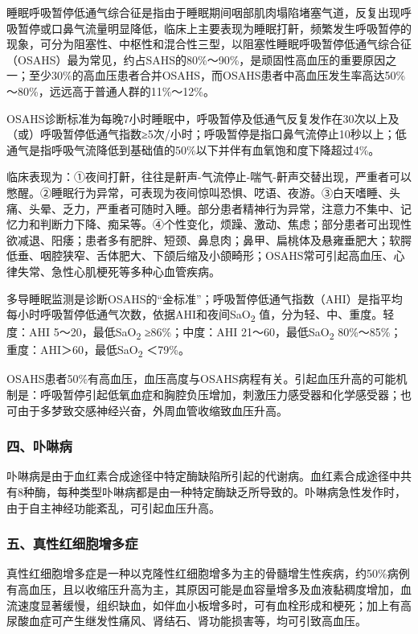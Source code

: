 睡眠呼吸暂停低通气综合征是指由于睡眠期间咽部肌肉塌陷堵塞气道，反复出现呼吸暂停或口鼻气流量明显降低，临床上主要表现为睡眠打鼾，频繁发生呼吸暂停的现象，可分为阻塞性、中枢性和混合性三型，以阻塞性睡眠呼吸暂停低通气综合征（OSAHS）最为常见，约占SAHS的80\%～90\%，是顽固性高血压的重要原因之一；至少30\%的高血压患者合并OSAHS，而OSAHS患者中高血压发生率高达50\%～80\%，远远高于普通人群的11\%～12\%。

OSAHS诊断标准为每晚7小时睡眠中，呼吸暂停及低通气反复发作在30次以上及（或）呼吸暂停低通气指数≥5次/小时；呼吸暂停是指口鼻气流停止10秒以上；低通气是指呼吸气流降低到基础值的50\%以下并伴有血氧饱和度下降超过4\%。

临床表现为：①夜间打鼾，往往是鼾声-气流停止-喘气-鼾声交替出现，严重者可以憋醒。②睡眠行为异常，可表现为夜间惊叫恐惧、呓语、夜游。③白天嗜睡、头痛、头晕、乏力，严重者可随时入睡。部分患者精神行为异常，注意力不集中、记忆力和判断力下降、痴呆等。④个性变化，烦躁、激动、焦虑；部分患者可出现性欲减退、阳痿；患者多有肥胖、短颈、鼻息肉；鼻甲、扁桃体及悬雍垂肥大；软腭低垂、咽腔狭窄、舌体肥大、下颌后缩及小颌畸形；OSAHS常可引起高血压、心律失常、急性心肌梗死等多种心血管疾病。

多导睡眠监测是诊断OSAHS的“金标准”；呼吸暂停低通气指数（AHI）是指平均每小时呼吸暂停低通气次数，依据AHI和夜间SaO\textsubscript{2}
值，分为轻、中、重度。轻度：AHI 5～20，最低SaO\textsubscript{2}
≥86\%；中度：AHI 21～60，最低SaO\textsubscript{2}
80\%～85\%；重度：AHI＞60，最低SaO\textsubscript{2} ＜79\%。

OSAHS患者50\%有高血压，血压高度与OSAHS病程有关。引起血压升高的可能机制是：呼吸暂停引起低氧血症和胸腔负压增加，刺激压力感受器和化学感受器；也可由于多梦致交感神经兴奋，外周血管收缩致血压升高。

\subsubsection{四、卟啉病}

卟啉病是由于血红素合成途径中特定酶缺陷所引起的代谢病。血红素合成途径中共有8种酶，每种类型卟啉病都是由一种特定酶缺乏所导致的。卟啉病急性发作时，由于自主神经功能紊乱，可引起血压升高。

\subsubsection{五、真性红细胞增多症}

真性红细胞增多症是一种以克隆性红细胞增多为主的骨髓增生性疾病，约50\%病例有高血压，且以收缩压升高为主，其原因可能是血容量增多及血液黏稠度增加，血流速度显著缓慢，组织缺血，如伴血小板增多时，可有血栓形成和梗死；加上有高尿酸血症可产生继发性痛风、肾结石、肾功能损害等，均可引致高血压。

